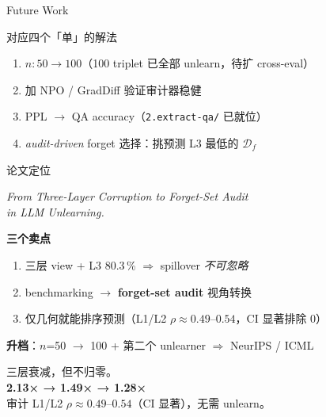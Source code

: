 \documentclass[aspectratio=169,10pt]{beamer}
\begin{document}
\begin{frame}{Future Work}
    \vspace{0.3em}
    \begin{center}
        \large
        对应四个「单」的解法
    \end{center}

    \vspace{0.6em}
    \begin{enumerate}
        \setlength\itemsep{0.5em}
        \item $n: 50 \to 100$（100 triplet 已全部 unlearn，待扩 cross-eval）
        \item 加 NPO / GradDiff 验证审计器稳健
        \item PPL $\to$ QA accuracy（\texttt{2.extract-qa/} 已就位）
        \item \emph{audit-driven} forget 选择：挑预测 L3 最低的 $\mathcal{D}_f$
    \end{enumerate}
\end{frame}

\begin{frame}{论文定位}
    \begin{center}
        \large
        \emph{From Three-Layer Corruption to Forget-Set Audit\\ in LLM Unlearning.}
    \end{center}

    \vspace{0.8em}
    \textbf{三个卖点}
    \begin{enumerate}
        \item 三层 view + L3 80.3\,\% $\Rightarrow$ spillover \emph{不可忽略}
        \item benchmarking $\to$ \textbf{forget-set audit} 视角转换
        \item 仅几何就能排序预测（L1/L2 $\rho \approx 0.49\text{--}0.54$，CI 显著排除 0）
    \end{enumerate}

    \vspace{0.6em}
    \begin{center}
        \small
        \textbf{升档}：$n$=50 $\to$ 100 + 第二个 unlearner $\Rightarrow$ NeurIPS / ICML
    \end{center}
\end{frame}

\begin{frame}[standout]
    三层衰减，但不归零。\\[0.5em]
    \normalsize
    \textbf{2.13× → 1.49× → 1.28×}\\[0.3em]
    审计 L1/L2 $\rho \approx 0.49\text{--}0.54$（CI 显著），无需 unlearn。
\end{frame}
\end{document}
